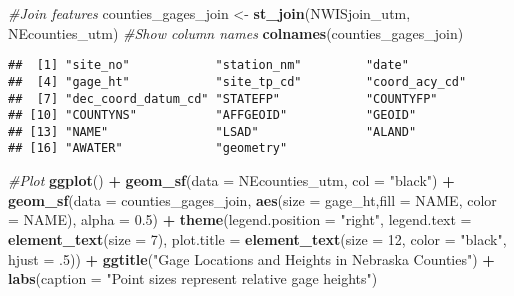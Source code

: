 \documentclass[]{article}
\newenvironment{Shaded}{\begin{snugshade}}{\end{snugshade}}
\newcommand{\KeywordTok}[1]{\textcolor[rgb]{0.13,0.29,0.53}{\textbf{#1}}}
\newcommand{\DataTypeTok}[1]{\textcolor[rgb]{0.13,0.29,0.53}{#1}}
\newcommand{\DecValTok}[1]{\textcolor[rgb]{0.00,0.00,0.81}{#1}}
\newcommand{\FloatTok}[1]{\textcolor[rgb]{0.00,0.00,0.81}{#1}}
\newcommand{\StringTok}[1]{\textcolor[rgb]{0.31,0.60,0.02}{#1}}
\newcommand{\CommentTok}[1]{\textcolor[rgb]{0.56,0.35,0.01}{\textit{#1}}}
\newcommand{\OperatorTok}[1]{\textcolor[rgb]{0.81,0.36,0.00}{\textbf{#1}}}
\newcommand{\NormalTok}[1]{#1}
\begin{document}
\begin{Shaded}
\begin{Highlighting}[]
\CommentTok{#Join features}
\NormalTok{counties_gages_join <-}\StringTok{ }\KeywordTok{st_join}\NormalTok{(NWISjoin_utm, NEcounties_utm)}
\CommentTok{#Show column names}
\KeywordTok{colnames}\NormalTok{(counties_gages_join)}
\end{Highlighting}
\end{Shaded}

\begin{verbatim}
##  [1] "site_no"            "station_nm"         "date"              
##  [4] "gage_ht"            "site_tp_cd"         "coord_acy_cd"      
##  [7] "dec_coord_datum_cd" "STATEFP"            "COUNTYFP"          
## [10] "COUNTYNS"           "AFFGEOID"           "GEOID"             
## [13] "NAME"               "LSAD"               "ALAND"             
## [16] "AWATER"             "geometry"
\end{verbatim}

\begin{Shaded}
\begin{Highlighting}[]
\CommentTok{#Plot}
\KeywordTok{ggplot}\NormalTok{() }\OperatorTok{+}
\StringTok{  }\KeywordTok{geom_sf}\NormalTok{(}\DataTypeTok{data =}\NormalTok{ NEcounties_utm, }\DataTypeTok{col =} \StringTok{"black"}\NormalTok{) }\OperatorTok{+}
\StringTok{  }\KeywordTok{geom_sf}\NormalTok{(}\DataTypeTok{data =}\NormalTok{ counties_gages_join, }
          \KeywordTok{aes}\NormalTok{(}\DataTypeTok{size =}\NormalTok{ gage_ht,}\DataTypeTok{fill =}\NormalTok{ NAME, }\DataTypeTok{color =}\NormalTok{ NAME), }\DataTypeTok{alpha =} \FloatTok{0.5}\NormalTok{) }\OperatorTok{+}
\StringTok{  }\KeywordTok{theme}\NormalTok{(}\DataTypeTok{legend.position =} \StringTok{"right"}\NormalTok{,}
        \DataTypeTok{legend.text =} \KeywordTok{element_text}\NormalTok{(}\DataTypeTok{size =} \DecValTok{7}\NormalTok{),}
        \DataTypeTok{plot.title =} \KeywordTok{element_text}\NormalTok{(}\DataTypeTok{size =} \DecValTok{12}\NormalTok{, }\DataTypeTok{color =} \StringTok{"black"}\NormalTok{, }\DataTypeTok{hjust =}\NormalTok{ .}\DecValTok{5}\NormalTok{)) }\OperatorTok{+}
\StringTok{  }\KeywordTok{ggtitle}\NormalTok{(}\StringTok{"Gage Locations and Heights in Nebraska Counties"}\NormalTok{) }\OperatorTok{+}
\StringTok{  }\KeywordTok{labs}\NormalTok{(}\DataTypeTok{caption =} \StringTok{"Point sizes represent relative gage heights"}\NormalTok{)}
\end{Highlighting}
\end{Shaded}
\end{document}
